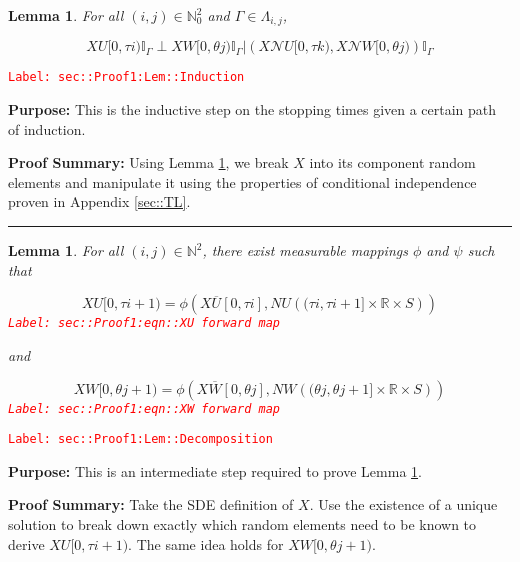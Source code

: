 \documentclass[12pt]{article}
\newcommand{\mb}{\mathbb}
\newcommand{\mc}{\mathcal}
\newcommand{\ov}{\overline}
\newcommand{\tr}{\textcolor{red}}
\newcommand{\labe}[1]{\tr{\texttt{Label: #1}}}
\newcommand{\purpose}{\textbf{Purpose: }}
\newcommand{\pfsum}{\textbf{Proof Summary: }}
\newcommand{\lin}{\rule{\linewidth}{0.4 pt}}
\renewcommand{\U}{U}							%
\newcommand{\UU}{W}								%
\renewcommand{\S}{S}							%
\newcommand{\X}{X}								%
\newcommand{\neigh}{\mc{N}}						%
\newcommand{\cl}{\ov}							%
\newcommand{\poiss}{N}							%
\newcommand{\rt}{\tau}							%
\newcommand{\rtt}{\theta}						%
\renewcommand{\it}{k}							%
\newcommand{\apath}{\Gamma}						%
\newcommand{\pathset}[2]{\Lambda_{#1,#2}}		%
\newtheorem{lem}[thms]{Lemma}
\begin{document}
\begin{lem}
For all \((i,j)\in \mb{N}_0^2\) and \(\apath{} \in \pathset{i}{j}\),

\[\X{\U}{[0,\rt{i})}\mb{I}_{\apath{}}\perp \X{\UU}{[0,\rtt{j})}\mb{I}_{\apath{}}|\left(\X{\neigh{\U}}{[0,\rt{\it})},\X{\neigh{\UU}}{[0,\rtt{j})}\right)\mb{I}_{\apath{}}\]
\label{sec::Proof1:Lem::Induction}
\end{lem}
\labe{sec::Proof1:Lem::Induction}

\purpose This is the inductive step on the stopping times given a certain path of induction.

\pfsum Using Lemma \ref{sec::Proof1:Lem::Decomposition}, we break \(\X{}{}\) into its component random elements and manipulate it using the properties of conditional independence proven in Appendix \ref{sec::TL}.

\lin

\begin{lem}
For all \((i,j)\in \mb{N}^2\), there exist measurable mappings \(\phi\) and \(\psi\) such that 

\begin{equation}
\X{\U}{[0,\rt{i+1})} = \phi\left(\X{\cl{\U}}{[0,\rt{i}]}, \poiss{\U}\left((\rt{i}, \rt{i+1}]\times \mb{R}\times \S\right)\right)
\label{sec::Proof1:eqn::XU forward map}
\end{equation}
\labe{sec::Proof1:eqn::XU forward map}

and

\begin{equation}
\X{\UU}{[0,\rtt{j+1})} = \phi\left(\X{\cl{\UU}}{[0,\rtt{j}]}, \poiss{\UU}\left((\rtt{j}, \rtt{j+1}]\times \mb{R}\times \S\right)\right)
\label{sec::Proof1:eqn::XW forward map}
\end{equation}
\labe{sec::Proof1:eqn::XW forward map}

\label{sec::Proof1:Lem::Decomposition}
\end{lem}
\labe{sec::Proof1:Lem::Decomposition}

\purpose This is an intermediate step required to prove Lemma \ref{sec::Proof1:Lem::Induction}.

\pfsum Take the SDE definition of \(\X{}{}\). Use the existence of a unique solution to break down exactly which random elements need to be known to derive \(\X{\U}{[0,\rt{i+1})}\). The same idea holds for \(\X{\UU}{[0,\rtt{j+1})}\).
\end{document}
